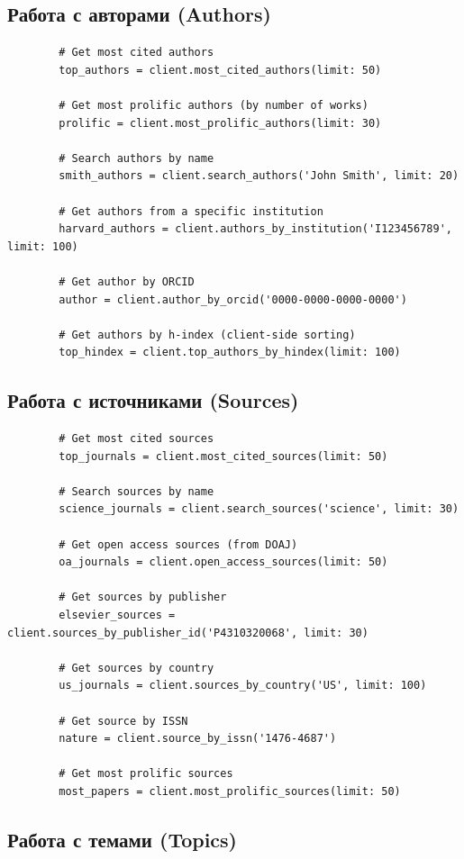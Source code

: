 \documentclass[a4paper,12pt]{article}
\begin{document}
	\subsection{Работа с авторами (Authors)}
	
	\begin{lstlisting}
		# Get most cited authors
		top_authors = client.most_cited_authors(limit: 50)
		
		# Get most prolific authors (by number of works)
		prolific = client.most_prolific_authors(limit: 30)
		
		# Search authors by name
		smith_authors = client.search_authors('John Smith', limit: 20)
		
		# Get authors from a specific institution
		harvard_authors = client.authors_by_institution('I123456789', limit: 100)
		
		# Get author by ORCID
		author = client.author_by_orcid('0000-0000-0000-0000')
		
		# Get authors by h-index (client-side sorting)
		top_hindex = client.top_authors_by_hindex(limit: 100)
	\end{lstlisting}
	
	\subsection{Работа с источниками (Sources)}
	
	\begin{lstlisting}
		# Get most cited sources
		top_journals = client.most_cited_sources(limit: 50)
		
		# Search sources by name
		science_journals = client.search_sources('science', limit: 30)
		
		# Get open access sources (from DOAJ)
		oa_journals = client.open_access_sources(limit: 50)
		
		# Get sources by publisher
		elsevier_sources = client.sources_by_publisher_id('P4310320068', limit: 30)
		
		# Get sources by country
		us_journals = client.sources_by_country('US', limit: 100)
		
		# Get source by ISSN
		nature = client.source_by_issn('1476-4687')
		
		# Get most prolific sources
		most_papers = client.most_prolific_sources(limit: 50)
	\end{lstlisting}
	
	\subsection{Работа с темами (Topics)}
	
\end{document}
